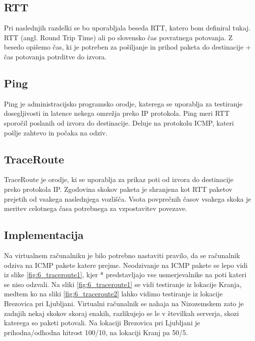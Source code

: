 \subsection{RTT}
Pri naslednjih razdelki se bo uporabljala beseda RTT, katero bom definiral tukaj. RTT (angl. Round Trip Time) ali po slovensko čas povratnega potovanja. Z besedo opišemo čas, ki je potreben za pošiljanje in prihod paketa do destinacije + čas potovanja potrditve do izvora.

\subsection{Ping}
Ping je administracijsko programsko orodje, katerega se uporablja za testiranje dosegljivosti in latence nekega omrežja preko IP protokola. Ping meri RTT sporočil poslanih od izvora do destinacije. Deluje na protokolu ICMP, kateri pošlje zahtevo in počaka na odziv.

\subsection{TraceRoute}
TraceRoute je orodje, ki se uporablja za prikaz poti od izvora do destinacije preko protokola IP. Zgodovina skokov paketa je shranjena kot RTT paketov prejetih od vsakega naslednjega vozlišča. Vsota povprečnih časov vsakega skoka je meritev celotnega časa potrebnega za vzpostavitev povezave.

\subsection{Implementacija}
Na virtualnem računalniku je bilo potrebno nastaviti pravilo, da se računalnik odziva na ICMP pakete katere prejme. Neodzivanje na ICMP pakete se lepo vidi iz slike \ref{fig:6_traceroute1}, kjer * predstavljajo vse usmerjevalnike na poti kateri se niso odzvali. Na sliki \ref{fig:6_traceroute1} se vidi testiranje iz lokacije Kranja, medtem ko na sliki \ref{fig:6_traceroute2} lahko vidimo testiranje iz lokacije Brezovica pri Ljubljani. Virtualni računalnik se nahaja na Nizozemskem zato je zadnjih nekaj skokov skoraj enakih, razlikujejo se le v številkah serverja, skozi katerega so paketi potovali. Na lokaciji Brezovica pri Ljubljani je prihodna/odhodna hitrost 100/10, na 
lokaciji Kranj pa 50/5. 

